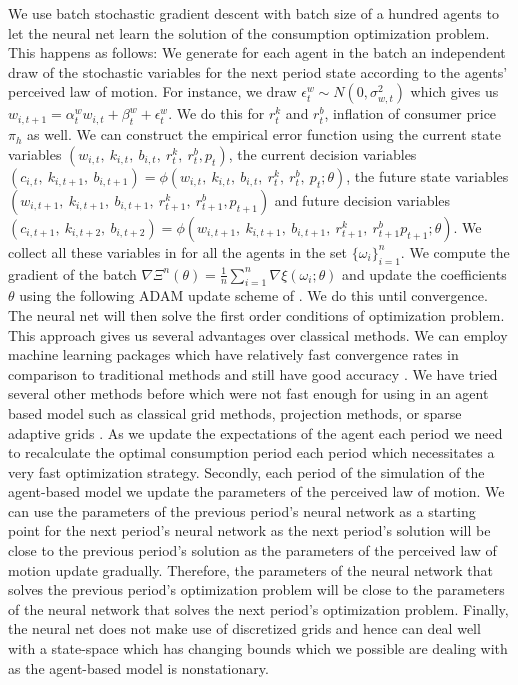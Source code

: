 \noindent We use batch stochastic gradient descent with batch size of a hundred agents to let the neural net learn the solution of the consumption optimization problem. This happens as follows: We generate for each agent in the batch an independent draw of the stochastic variables for the next period state according to the agents' perceived law of motion. For instance, we draw $\epsilon^w_t \sim N(0,\sigma^2_{w,t})$ which gives us $w_{i,t+1} = \alpha^w_{t} w_{i,t} +\beta^w_{t}+\epsilon^w_t$. We do this for $r^k_t$ and $r^b_t$, inflation of consumer price $\pi_h$ as well. We can construct the empirical error function using the current state variables $(w_{i,t}, \ k_{i,t}, \ b_{i,t}, \ r^k_t, \ r^b_t, p_t)$, the current decision variables $(c_{i,t}, \ k_{i,t+1}, \ b_{i,t+1}) = \phi(w_{i,t}, \ k_{i,t}, \ b_{i,t}, \ r^k_t, \ r^b_t, \ p_t;\theta)$, the future state variables $(w_{i,t+1}, \ k_{i,t+1}, \ b_{i,t+1}, \ r^k_{t+1}, \ r^b_{t+1}, p_{t+1})$ and future decision variables \\ $(c_{i,t+1}, \ k_{i,t+2}, \ b_{i,t+2}) = \phi(w_{i,t+1}, \ k_{i,t+1}, \ b_{i,t+1}, \ r^k_{t+1}, \ r^b_{t+1} p_{t+1};\theta)$. We collect all these variables in for all the agents in the set $\{\omega_i \}_{i=1}^n$. We compute the gradient of the batch $\nabla \Xi^n(\theta)=\frac{1}{n} \sum_{i=1}^n \nabla \xi\left(\omega_i ; \theta\right)$ and update the coefficients $\theta$ using the following ADAM update scheme of \cite{kingma_adam_2017}. We do this until convergence. The neural net will then solve the first order conditions of optimization problem.\\

\noindent This approach gives us several advantages over classical methods. We can employ machine learning packages which have relatively fast convergence rates in comparison to traditional methods and still have good accuracy \citep{maliar_deep_2021}. We have tried several other methods before which were not fast enough for using in an agent based model such as classical grid methods, projection methods, or sparse adaptive grids \citep{brumm_using_2017}. As we update the expectations of the agent each period we need to recalculate the optimal consumption period each period which necessitates a very fast optimization strategy. Secondly, each period of the simulation of the agent-based model we update the parameters of the perceived law of motion. We can use the parameters of the previous period's neural network as a starting point for the next period's neural network as the next period's solution will be close to the previous period's solution as the parameters of the perceived law of motion update gradually. Therefore, the parameters of the neural network that solves the previous period's optimization problem will be close to the parameters of the neural network that solves the next period's optimization problem. Finally, the neural net does not make use of discretized grids and hence can deal well with a state-space which has changing bounds which we possible are dealing with as the agent-based model is nonstationary.


